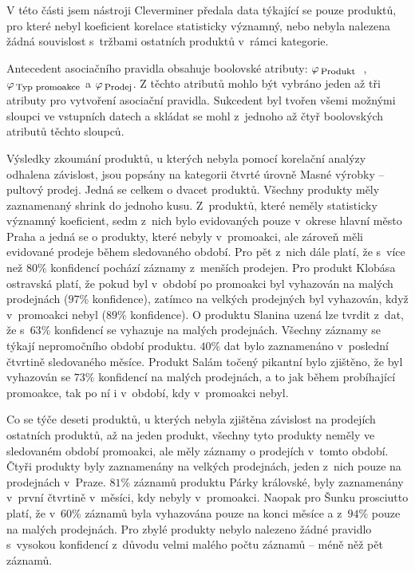 V této části jsem nástroji Cleverminer předala data týkající se pouze produktů, pro které nebyl koeficient korelace statisticky významný, nebo nebyla nalezena žádná souvislost s~tržbami ostatních produktů v~rámci kategorie.

Antecedent asociačního pravidla obsahuje boolovské atributy: 
$    \varphi_{\mbox{\,\footnotesize Produkt }}      $ , 
$    \varphi_{\mbox{\,\footnotesize Typ promoakce}} $ a 
$    \varphi_{\mbox{\,\footnotesize Prodej}}$. 
Z těchto atributů mohlo být vybráno jeden až tři atributy pro vytvoření asociační pravidla. Sukcedent byl tvořen všemi možnými sloupci ve vstupních datech a skládat se mohl z~jednoho až čtyř boolovských atributů těchto sloupců.

Výsledky zkoumání produktů, u kterých nebyla pomocí korelační analýzy odhalena závislost, jsou popsány na kategorii čtvrté úrovně Masné výrobky -- pultový prodej. Jedná se celkem o dvacet produktů.
Všechny produkty měly zaznamenaný shrink do jednoho kusu. 
Z~produktů, které neměly statisticky významný koeficient, sedm z~nich bylo evidovaných pouze v~okrese hlavní město Praha a jedná se o produkty, které nebyly v~promoakci, ale zároveň měli evidované prodeje během sledovaného období. Pro pět z~nich dále platí, že s~více než $80\%$ konfidencí pochází záznamy z~menších prodejen.
Pro produkt Klobása ostravská platí, že pokud byl v~období po promoakci byl vyhazován na malých prodejnách ($97\%$ konfidence), zatímco na velkých prodejných byl vyhazován, když v~promoakci nebyl ($89\%$ konfidence). 
O produktu Slanina uzená lze tvrdit z~dat, že s~$63\%$ konfidencí se vyhazuje na malých prodejnách. Všechny záznamy se týkají nepromočního období produktu. $40\%$ dat bylo zaznamenáno v~poslední čtvrtině sledovaného měsíce. 
Produkt Salám točený pikantní bylo zjištěno, že byl vyhazován se $ 73\%$ konfidencí na malých prodejnách, a to jak během probíhající promoakce, tak po ní  i v~období, kdy v~promoakci nebyl. 

Co se týče deseti produktů, u kterých nebyla zjištěna závislost na prodejích ostatních produktů, až na jeden produkt, všechny tyto produkty neměly ve sledovaném období promoakci, ale měly záznamy o prodejích v~tomto období. Čtyři produkty byly zaznamenány na velkých prodejnách, jeden z~nich pouze na prodejnách v~Praze. $81\%$ záznamů produktu Párky královské, byly zaznamenány v~první čtvrtině v~měsíci, kdy nebyly v~promoakci. Naopak pro Šunku prosciutto platí, že v~60\% záznamů byla vyhazována pouze na konci měsíce a z~$94\%$ pouze na malých prodejnách. Pro zbylé produkty nebylo nalezeno žádné pravidlo s~vysokou konfidencí z~důvodu velmi malého počtu záznamů -- méně něž pět záznamů.

